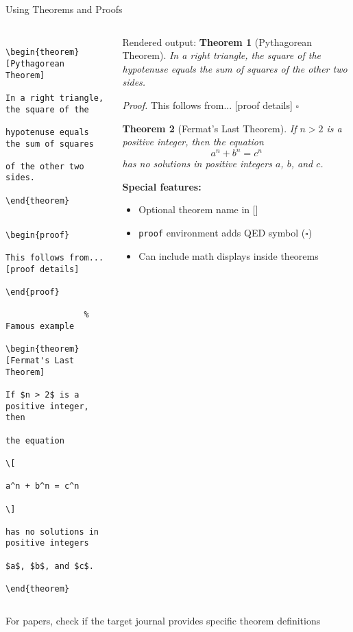 \begin{frame}[fragile]{Using Theorems and Proofs}
	\begin{columns}
		\begin{column}{0.5\textwidth}
			\begin{lstlisting}[basicstyle=\footnotesize\ttfamily]
				% Basic usage
				\begin{theorem}[Pythagorean Theorem]
					In a right triangle, the square of the 
					hypotenuse equals the sum of squares 
					of the other two sides.
				\end{theorem}
				
				\begin{proof}
					This follows from... [proof details]
				\end{proof}
				
				% Famous example
				\begin{theorem}[Fermat's Last Theorem]
					If $n > 2$ is a positive integer, then 
					the equation
					\[
					a^n + b^n = c^n
					\]
					has no solutions in positive integers 
					$a$, $b$, and $c$.
				\end{theorem}
			\end{lstlisting}
		\end{column}
		
		\begin{column}{0.5\textwidth}
			\def\labelenumi{\Roman{enumi}.}
			
			\begin{block}{Rendered output:}
				\textbf{Theorem 1} (Pythagorean Theorem). \textit{In a right triangle, the square of the hypotenuse equals the sum of squares of the other two sides.}
				
				\textit{Proof.} This follows from... [proof details] \hfill $\square$
				
				\vspace{1em}
				
				\textbf{Theorem 2} (Fermat's Last Theorem). \textit{If $n > 2$ is a positive integer, then the equation
					\[
					a^n + b^n = c^n
					\]
					has no solutions in positive integers $a$, $b$, and $c$.}
			\end{block}
			
			\textbf{Special features:}
			\begin{itemize}
				\item Optional theorem name in []
				\item \texttt{proof} environment adds QED symbol ($\square$)
				\item Can include math displays inside theorems
			\end{itemize}
		\end{column}
	\end{columns}
	
	\begin{tip}
		For papers, check if the target journal provides specific theorem definitions
	\end{tip}
\end{frame}

